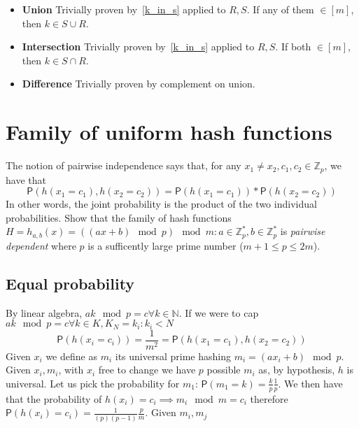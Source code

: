 \documentclass{article}
\newcommand*{\prob}{\mathsf{P}}    %
\begin{document}
\begin{itemize}
    \item \textbf{Union} Trivially proven by~\ref{k_in_s} applied to $R, S$.
    If any of them $\in [m]$, then $k \in S \cup R$.
    \item \textbf{Intersection} Trivially proven by~\ref{k_in_s} applied to $R, S$.
    If both $\in [m]$, then $k \in S \cap R$.
    \item \textbf{Difference} Trivially proven by complement on union.
\end{itemize}


\newpage
\section{Family of uniform hash functions}

The notion of pairwise independence says that, for any $x_{1} \neq x_{2}, c_{1}, c_{2}
\in \mathbb{Z}_{p}$, we have that
    \begin{equation}
    \prob(h(x_{1} = c_{1}), h(x_{2} = c_{2})) = \prob(h(x_{1} = c_{1})) * \prob(h(x_{2} = c_{2}))
    \end{equation}
In other words, the joint probability is the product of the two individual probabilities.
Show that the family of hash functions $H = {h_{a,b}(x) = ((ax + b) \mod p) \mod m}:
a \in \mathbb{Z}^{*}_{p},
b \in \mathbb{Z}^{*}_{p}$ is \emph{pairwise dependent}
where $p$ is a sufficently large prime number ($m + 1 \leq p \leq 2m$).

\subsection{Equal probability}

By linear algebra, $ak \mod p = c \forall k \in \mathbb{N}$.
If we were to cap $ak \mod p = c \forall k \in K, K_{N} = {k_{i}: k_{i} < N}$
\begin{equation}
\prob(h(x_{i} = c_{i})) = \frac{1}{m^{2}} = \prob(h(x_{1} = c_{1}), h(x_{2} = c_{2}))
\end{equation}
Given $x_{i}$ we define as $m_{i}$ its universal prime hashing $m_{i} = (ax_{i} + b) \mod p$.
Given $x_{i}, m_{i}$, with $x_{i}$ free to change we have $p$ possible
$m_{i}$ as, by hypothesis, $h$ is universal.
Let us pick the probability for $m_{1}$: $\prob(m_{1} = k) = \frac{k}{p}\frac{1}{p}$.
We then have that the probability of $h(x_{i}) = c_{i} \implies m_{i} \mod m = c_{i}$
therefore $\prob(h(x_{i}) = c_{i}) = \frac{1}{(p)(p - 1)} \frac{p}{m}$.
Given $m_{i}, m_{j}$
\end{document}
